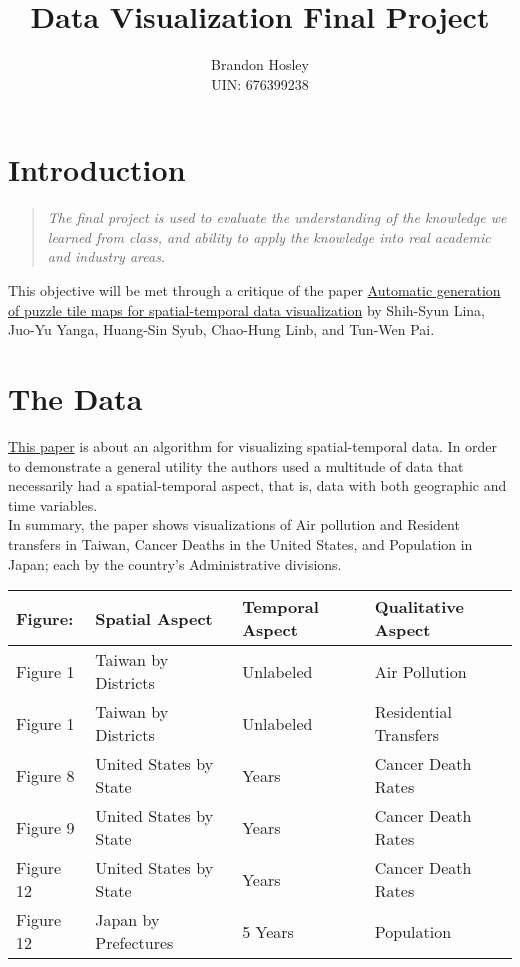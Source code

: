 \documentclass[a4paper,man,natbib]{apa6}
\title{Data Visualization Final Project}
\author{Brandon Hosley \\ UIN: 676399238}
\date{}
\affiliation{Yanhui Guo, Ph.D}
\begin{document}
	\maketitle
	\raggedbottom
	\section{Introduction}
	\begin{quote}\emph{
		The final project is used to evaluate the understanding of the knowledge we learned from class, and ability to apply the knowledge into real academic and industry areas. 
	}\end{quote}
	This objective will be met through a critique of the paper
	\href{https://www.sciencedirect.com/science/article/pii/S009784931930055X}
	{Automatic generation of puzzle tile maps for spatial-temporal data visualization} by 
	Shih-Syun Lina,
	Juo-Yu Yanga, 
	Huang-Sin Syub,
	Chao-Hung Linb, and
	Tun-Wen Pai.

	\section{The Data}
	
	\href{https://www.sciencedirect.com/science/article/pii/S009784931930055X}
	{This paper}
	is about an algorithm for visualizing spatial-temporal data.
	In order to demonstrate a general utility the authors used a multitude of data that necessarily had a spatial-temporal aspect, that is, data with both geographic and time variables. \\
	In summary, the paper shows visualizations of Air pollution and Resident transfers in Taiwan, Cancer Deaths in the United States, and Population in Japan; each by the country's Administrative divisions. \\
	\vspace{2em}
	
	\begin{tabular}{l l l l}
		Figure: & Spatial Aspect & Temporal Aspect & Qualitative Aspect \\
		\hline
		Figure 1 & Taiwan by Districts & Unlabeled & Air Pollution \\
		Figure 1 & Taiwan by Districts & Unlabeled & Residential Transfers \\
		Figure 8 & United States by State & Years & Cancer Death Rates \\
		Figure 9 & United States by State & Years & Cancer Death Rates \\
		Figure 12 & United States by State & Years & Cancer Death Rates \\
		Figure 12 & Japan by Prefectures & 5 Years & Population \\
	\end{tabular}
	\vspace{2em}
	
\end{document}
